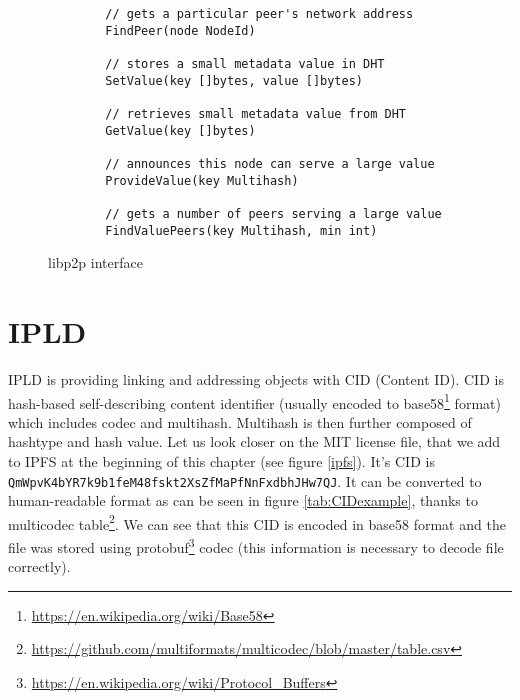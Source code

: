 \begin{figure}[h]
    \centering
    \begin{lstlisting}
        // gets a particular peer's network address
        FindPeer(node NodeId)

        // stores a small metadata value in DHT
        SetValue(key []bytes, value []bytes)

        // retrieves small metadata value from DHT
        GetValue(key []bytes)

        // announces this node can serve a large value
        ProvideValue(key Multihash)

        // gets a number of peers serving a large value
        FindValuePeers(key Multihash, min int)

    \end{lstlisting}
    \caption{libp2p interface}
    \label{libp2pInterface}
\end{figure}

\section{IPLD}
IPLD is providing linking and addressing objects with CID (Content ID). CID is hash-based self-describing content identifier (usually encoded to base58\footnote{\url{https://en.wikipedia.org/wiki/Base58}} format) which includes codec and multihash. Multihash is then further composed of hashtype and hash value. Let us look closer on the MIT license file, that we add to IPFS at the beginning of this chapter (see figure \ref{ipfs}). It's CID is \texttt{QmWpvK4bYR7k9b1feM48fsk\-t2XsZfMaPfNnFxdbhJHw7QJ}. It can be converted to human-readable format as can be seen in figure \ref{tab:CIDexample}, thanks to multicodec table\footnote{\url{https://github.com/multiformats/multicodec/blob/master/table.csv}}. We can see that this CID is encoded in base58 format and the file was stored using protobuf\footnote{\url{https://en.wikipedia.org/wiki/Protocol\_Buffers}} codec (this information is necessary to decode file correctly).



